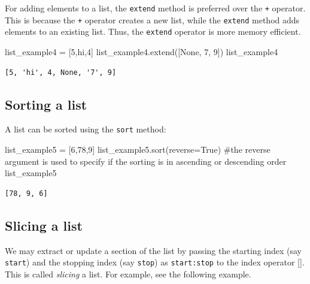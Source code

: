 \documentclass[
  letterpaper,
  DIV=11,
  numbers=noendperiod]{scrreprt}
\newenvironment{Shaded}{\begin{snugshade}}{\end{snugshade}}
\newcommand{\CommentTok}[1]{\textcolor[rgb]{0.37,0.37,0.37}{#1}}
\newcommand{\DecValTok}[1]{\textcolor[rgb]{0.68,0.00,0.00}{#1}}
\newcommand{\NormalTok}[1]{\textcolor[rgb]{0.00,0.23,0.31}{#1}}
\newcommand{\OperatorTok}[1]{\textcolor[rgb]{0.37,0.37,0.37}{#1}}
\newcommand{\StringTok}[1]{\textcolor[rgb]{0.13,0.47,0.30}{#1}}
\newcommand{\VariableTok}[1]{\textcolor[rgb]{0.07,0.07,0.07}{#1}}
\begin{document}
For adding elements to a list, the \texttt{extend} method is preferred
over the \texttt{+} operator. This is because the \texttt{+} operator
creates a new list, while the \texttt{extend} method adds elements to an
existing list. Thus, the \texttt{extend} operator is more memory
efficient.

\begin{Shaded}
\begin{Highlighting}[]
\NormalTok{list\_example4 }\OperatorTok{=}\NormalTok{ [}\DecValTok{5}\NormalTok{,}\StringTok{\textquotesingle{}hi\textquotesingle{}}\NormalTok{,}\DecValTok{4}\NormalTok{]}
\NormalTok{list\_example4.extend([}\VariableTok{None}\NormalTok{, }\StringTok{\textquotesingle{}7\textquotesingle{}}\NormalTok{, }\DecValTok{9}\NormalTok{])}
\NormalTok{list\_example4}
\end{Highlighting}
\end{Shaded}

\begin{verbatim}
[5, 'hi', 4, None, '7', 9]
\end{verbatim}

\hypertarget{sorting-a-list}{%
\subsection{Sorting a list}\label{sorting-a-list}}

A list can be sorted using the \texttt{sort} method:

\begin{Shaded}
\begin{Highlighting}[]
\NormalTok{list\_example5 }\OperatorTok{=}\NormalTok{ [}\DecValTok{6}\NormalTok{,}\DecValTok{78}\NormalTok{,}\DecValTok{9}\NormalTok{]}
\NormalTok{list\_example5.sort(reverse}\OperatorTok{=}\VariableTok{True}\NormalTok{) }\CommentTok{\#the reverse argument is used to specify if the sorting is in ascending or descending order}
\NormalTok{list\_example5}
\end{Highlighting}
\end{Shaded}

\begin{verbatim}
[78, 9, 6]
\end{verbatim}

\hypertarget{slicing-a-list}{%
\subsection{Slicing a list}\label{slicing-a-list}}

We may extract or update a section of the list by passing the starting
index (say \texttt{start}) and the stopping index (say \texttt{stop}) as
\texttt{start:stop} to the index operator {[}{]}. This is called
\emph{slicing} a list. For example, see the following example.
\end{document}
